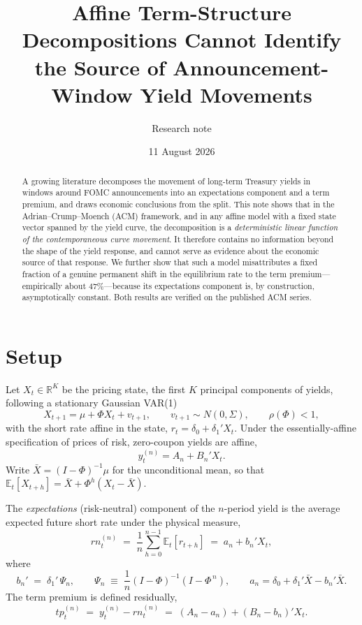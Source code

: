 \documentclass[11pt]{article}
\title{\vspace{-2em}\textbf{Affine Term-Structure Decompositions Cannot Identify\\ the Source of Announcement-Window Yield Movements}}
\author{Research note}
\date{11 August 2026}
\theoremstyle{remark}\newtheorem{remark}{Remark}
\begin{document}
\maketitle
\vspace{-1.5em}

\begin{abstract}
\noindent A growing literature decomposes the movement of long-term Treasury yields in windows around FOMC announcements into an expectations component and a term premium, and draws economic conclusions from the split. This note shows that in the Adrian--Crump--Moench (ACM) framework, and in any affine model with a fixed state vector spanned by the yield curve, the decomposition is a \emph{deterministic linear function of the contemporaneous curve movement}. It therefore contains no information beyond the shape of the yield response, and cannot serve as evidence about the economic source of that response. We further show that such a model misattributes a fixed fraction of a genuine permanent shift in the equilibrium rate to the term premium---empirically about 47\%---because its expectations component is, by construction, asymptotically constant. Both results are verified on the published ACM series.
\end{abstract}

\section{Setup}

Let $X_t\in\mathbb{R}^K$ be the pricing state, the first $K$ principal components of yields, following a stationary Gaussian VAR(1)
\begin{equation}
X_{t+1}=\mu+\Phi X_t+v_{t+1},\qquad v_{t+1}\sim N(0,\Sigma),\qquad \rho(\Phi)<1,
\end{equation}
with the short rate affine in the state, $r_t=\delta_0+\delta_1'X_t$. Under the essentially-affine specification of prices of risk, zero-coupon yields are affine,
\begin{equation}
y_t^{(n)}=A_n+B_n'X_t .
\end{equation}
Write $\bar X=(I-\Phi)^{-1}\mu$ for the unconditional mean, so that $\mathbb{E}_t[X_{t+h}]=\bar X+\Phi^h(X_t-\bar X)$.

The \emph{expectations} (risk-neutral) component of the $n$-period yield is the average expected future short rate under the physical measure,
\begin{equation}
rn_t^{(n)}\;=\;\frac1n\sum_{h=0}^{n-1}\mathbb{E}_t\!\left[r_{t+h}\right]
\;=\;a_n+b_n'X_t,
\end{equation}
where
\begin{equation}
b_n'\;=\;\delta_1'\,\Psi_n,\qquad
\Psi_n\;\equiv\;\frac1n(I-\Phi)^{-1}\!\left(I-\Phi^{\,n}\right),\qquad
a_n=\delta_0+\delta_1'\bar X-b_n'\bar X .
\label{eq:bn}
\end{equation}
The term premium is defined residually,
\begin{equation}
tp_t^{(n)}\;=\;y_t^{(n)}-rn_t^{(n)}\;=\;(A_n-a_n)+(B_n-b_n)'X_t .
\end{equation}
\end{document}
